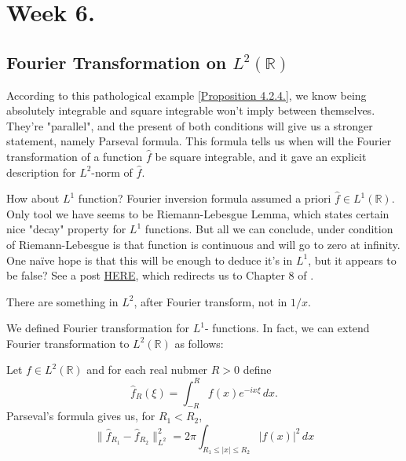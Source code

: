 \section{Week 6.}

\subsection{Fourier Transformation on $L^2(\mathbb R)$}

According to this pathological example \ref{Proposition 4.2.4.}, we know being absolutely integrable and square integrable won't imply between themselves. They're "parallel", and the present of both conditions will give us a stronger statement, namely Parseval formula. This formula tells us when will the Fourier transformation of a function $\hat{f}$ be square integrable, and it gave an explicit description for $L^2$-norm of $\hat{f}$.

\begin{Question}
    How about $L^1$ function? Fourier inversion formula assumed a priori $\hat{f}\in L^1(\mathbb R)$. 
    Only tool we have seems to be Riemann-Lebesgue Lemma, which states certain nice "decay" property for $L^1$ functions. But all we can conclude, under condition of Riemann-Lebesgue is that function is continuous and will go to zero at infinity. One na\"ive hope is that this will be enough to deduce it's in $L^1$, but it appears to be false? See a post \href{https://math.stackexchange.com/questions/465509/conditions-for-the-fourier-transform-of-an-l1-function-to-be-in-l1}{HERE}, which redirects us to Chapter 8 of \cite{folland1999real}.
\end{Question}

\begin{Example}
    There are something in $L^2$, after Fourier transform, not in $1/x$.
\end{Example}

We defined Fourier transformation for $L^1$- functions. In fact, we can extend Fourier transformation to $L^2(\mathbb R)$ as follows:

Let $f\in L^2(\mathbb R)$ and for each real nubmer $R>0$ define 
\[\hat{f}_R(\xi) = \int_{-R}^R f(x)e^{-ix\xi} \,dx.\]
Parseval's formula gives us, for $R_1< R_2$, 
\begin{equation}\label{Eq 4.34}
    \lVert \hat{f}_{R_1}-\hat{f}_{R_2}\rVert^2_{L^2}=2\pi \int_{R_1\leq \vert x\vert \leq R_2} \vert f(x)\vert^2 \,dx
\end{equation}

